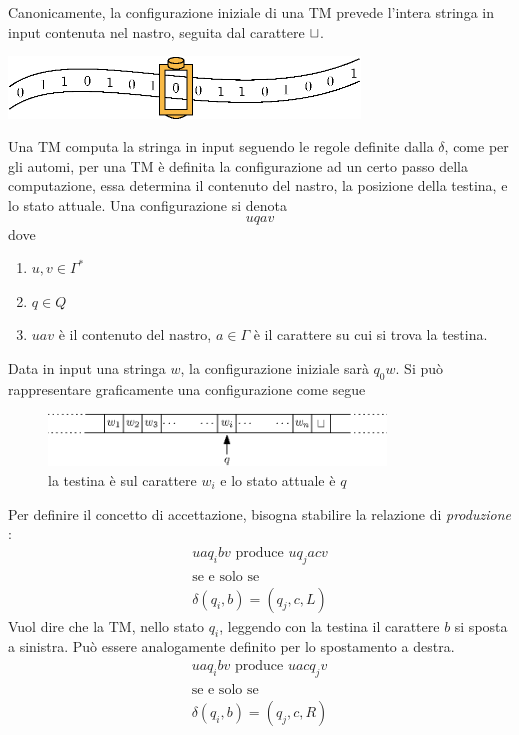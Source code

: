\documentclass[10pt, letterpaper]{report}
\begin{document}
Canonicamente, la configurazione iniziale di una TM prevede l'intera stringa in input contenuta nel nastro, seguita 
dal carattere ${\sqcup}$.\begin{center}
    \includegraphics[width=0.7\textwidth ]{images/turingMachine.eps}
\end{center}
Una TM computa la stringa in input seguendo le regole definite dalla $\delta$, come per gli automi, per una 
TM è definita la configurazione ad un certo passo della computazione, essa determina il contenuto del nastro, la 
posizione della testina, e lo stato attuale. Una configurazione si denota $$ uqav$$ dove \begin{enumerate}
    \item $u,v\in\Gamma^*$
    \item $q\in Q$
    \item $uav$ è il contenuto del nastro, $a\in\Gamma$ è il carattere su cui si trova la testina.
\end{enumerate}
Data in input una stringa $w$, la configurazione iniziale sarà $q_0w$. Si può rappresentare graficamente una 
configurazione come segue\begin{center}\begin{figure}[h!]
    \centering 
    \includegraphics[width=0.8\textwidth ]{images/confTM.eps}
    \caption{la testina è sul carattere $w_i$ e lo stato attuale è $q$}
\end{figure}
\end{center}
Per definire il concetto di accettazione, bisogna stabilire la relazione di \textit{produzione} :
 $$\begin{matrix}
    uaq_ibv \text{ produce }uq_jacv \\ \text{se e solo se}\\ 
    \delta(q_i,b)=(q_j,c,L)
 \end{matrix} $$
Vuol dire che la TM, nello stato $q_i$, leggendo con la testina il carattere $b$ si sposta a sinistra. Può 
essere analogamente definito per lo spostamento a destra.
$$\begin{matrix}
    uaq_ibv \text{ produce }uacq_jv \\ \text{se e solo se}\\ 
    \delta(q_i,b)=(q_j,c,R)
 \end{matrix} $$
\end{document}
